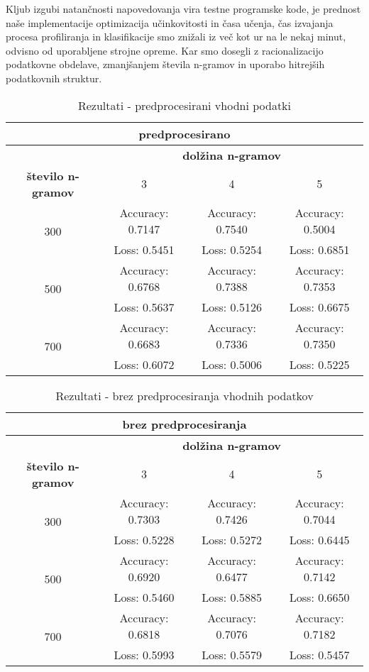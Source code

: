 \documentclass[sigconf,nonacm]{acmart}
\begin{document}
Kljub izgubi natančnosti napovedovanja vira testne programske kode, je prednost naše implementacije optimizacija učinkovitosti in časa učenja, čas izvajanja procesa profiliranja in klasifikacije smo znižali iz več kot ur na le nekaj minut, odvisno od uporabljene strojne opreme.
Kar smo dosegli z racionalizacijo podatkovne obdelave, zmanjšanjem števila n-gramov in uporabo hitrejših podatkovnih struktur.

\begin{table}[h!]
	\centering
	\small
	\begin{tabular}{|c|c|c|c|}
		\multicolumn{4}{c}{predprocesirano}\\
		\hline
		& \multicolumn{3}{c}{\textbf{dolžina n-gramov}}\\
		\hline
		\textbf{število n-gramov} & 3 & 4 & 5\\
		\hline
		\multirow{2}{4em}{300} & Accuracy: 0.7147 & Accuracy: 0.7540 & Accuracy: 0.5004\\
		& Loss: 0.5451 & Loss: 0.5254 & Loss: 0.6851\\
		\hline
		\multirow{2}{4em}{500} & Accuracy: 0.6768 & Accuracy: 0.7388 & Accuracy: 0.7353\\
		& Loss: 0.5637 & Loss: 0.5126 & Loss: 0.6675\\
		\hline
		\multirow{2}{4em}{700} & Accuracy: 0.6683 & Accuracy: 0.7336 & Accuracy: 0.7350\\
		& Loss: 0.6072 & Loss: 0.5006 & Loss: 0.5225\\
		\hline
	\end{tabular}
	\caption{Rezultati - predprocesirani vhodni podatki}
	\label{tab:sample}
\end{table}
\begin{table}[h!]
	\centering
	\small
	\begin{tabular}{|c|c|c|c|}
		\multicolumn{4}{c}{brez predprocesiranja}\\
		\hline
		& \multicolumn{3}{c}{\textbf{dolžina n-gramov}}\\
		\hline
		\textbf{število n-gramov} & 3 & 4 & 5\\
		\hline
		\multirow{2}{4em}{300} & Accuracy: 0.7303 & Accuracy: 0.7426 & Accuracy: 0.7044\\
		& Loss: 0.5228 & Loss: 0.5272 & Loss: 0.6445\\
		\hline
		\multirow{2}{4em}{500} & Accuracy: 0.6920 & Accuracy: 0.6477 & Accuracy: 0.7142\\
		& Loss: 0.5460 & Loss: 0.5885 & Loss: 0.6650\\
		\hline
		\multirow{2}{4em}{700} & Accuracy: 0.6818 & Accuracy: 0.7076 & Accuracy: 0.7182\\
		& Loss: 0.5993 & Loss: 0.5579 & Loss: 0.5457\\
		\hline
	\end{tabular}
	\caption{Rezultati - brez predprocesiranja vhodnih podatkov}
	\label{tab:sample}
\end{table}
\end{document}
